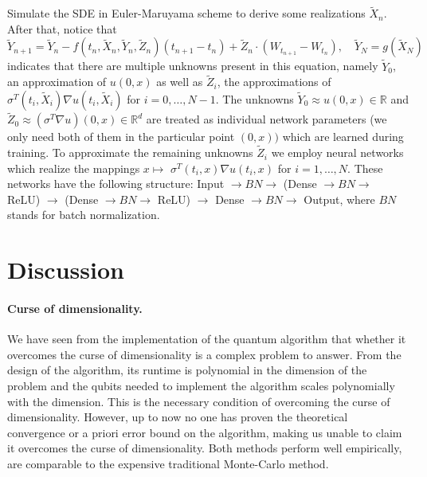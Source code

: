 \documentclass[11pt]{article}
\theoremstyle{definition}
\begin{document}
Simulate the SDE in Euler-Maruyama scheme to derive some realizations $\tilde{X}_n$. After that, notice that
$$
\tilde{Y}_{n+1}=\tilde{Y}_n-f\left(t_n, \tilde{X}_n, \tilde{Y}_n, \tilde{Z}_n\right)\left(t_{n+1}-t_n\right)+\tilde{Z}_n \cdot\left(W_{t_{n+1}}-W_{t_n}\right), \quad \tilde{Y}_N=g\left(\tilde{X}_N\right)
$$
indicates that there are multiple unknowns present in this equation, namely
 $\tilde{Y}_0$, an approximation of $u(0, x)$ as well as
 $\tilde{Z}_i$, the approximations of $\sigma^T\left(t_i, \tilde{X}_i\right) \nabla u\left(t_i, \tilde{X}_i\right)$ for $i=0, \ldots, N-1$.
The unknowns $\tilde{Y}_0 \approx u(0, x) \in \mathbb{R}$ and $\tilde{Z}_0 \approx\left(\sigma^T \nabla u\right)(0, x) \in \mathbb{R}^d$ are treated as individual network parameters (we only need both of them in the particular point $(0, x))$ which are learned during training.
To approximate the remaining unknowns $\tilde{Z}_i$ we employ neural networks which realize the mappings $x \mapsto$ $\sigma^T\left(t_i, x\right) \nabla u\left(t_i, x\right)$ for $i=1, \ldots, N$.
These networks have the following structure:
Input $\rightarrow B N \rightarrow$ (Dense $\rightarrow B N \rightarrow$ ReLU) $\rightarrow$ (Dense $\rightarrow B N \rightarrow$ ReLU) $\rightarrow$ Dense $\rightarrow B N \rightarrow$ Output, where  $BN$ stands for batch normalization.


\section{Discussion}
\paragraph{Curse of dimensionality. }
We have seen from the implementation of the quantum algorithm that whether it overcomes the curse of dimensionality is a complex problem to answer. From the design of the algorithm, its runtime is polynomial in the dimension of the problem and the qubits needed to implement the algorithm scales polynomially with the dimension. This is the necessary condition of overcoming the curse of dimensionality. However, up to now no one has proven the theoretical convergence or a priori error bound on the algorithm, making us unable to claim it overcomes the curse of dimensionality. Both methods perform well empirically, are comparable to the expensive traditional Monte-Carlo method.\\
\end{document}
